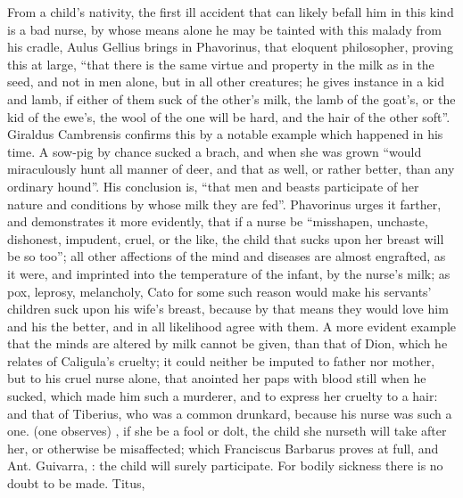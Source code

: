 From a child's nativity, the first ill accident that can likely befall him in
this kind is a bad nurse, by whose means alone he may be tainted with this
malady from his cradle, Aulus Gellius
 brings in Phavorinus, that eloquent
philosopher, proving this at large, \enquote{that there is the
same virtue and property in the milk as in the seed, and not in men alone, but
in all other creatures; he gives instance in a kid and lamb, if either of them
suck of the other's milk, the lamb of the goat's, or the kid of the ewe's, the
wool of the one will be hard, and the hair of the other soft}. Giraldus
Cambrensis  confirms this
by a notable example which happened in his time. A sow-pig by chance sucked a
brach, and when she was grown \enquote{would miraculously hunt all
manner of deer, and that as well, or rather better, than any ordinary hound}.
His conclusion is, \enquote{that men and beasts participate of her
nature and conditions by whose milk they are fed}. Phavorinus urges it farther,
and demonstrates it more evidently, that if a nurse be
\enquote{misshapen, unchaste, dishonest, impudent,
cruel, or the like, the child that sucks upon her breast
will be so too}; all other affections of the mind and diseases are almost
engrafted, as it were, and imprinted into the temperature of the infant, by the
nurse's milk; as pox, leprosy, melancholy, \etc{} Cato for some such reason
would make his servants' children suck upon his wife's breast, because by that
means they would love him and his the better, and in all likelihood agree with
them. A more evident example that the minds are altered by milk cannot be
given, than that of Dion, which he relates of Caligula's
cruelty; it could neither be imputed to father nor mother, but to his cruel
nurse alone, that anointed her paps with blood still when he sucked, which made
him such a murderer, and to express her cruelty to a hair: and that of
Tiberius, who was a common drunkard, because his nurse was such a one.  (one observes) , if she be a fool or dolt, the child she nurseth will take after her,
or otherwise be misaffected; which Franciscus Barbarus  proves at full, and Ant. Guivarra,
: the child will surely
participate. For bodily sickness there is no doubt to be made. Titus,
